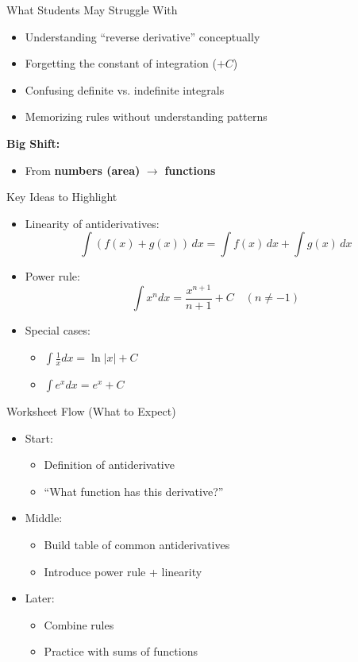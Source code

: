 \documentclass[dvipsnames]{beamer}
\begin{document}
\begin{frame}{What Students May Struggle With}
\begin{itemize}
\item Understanding “reverse derivative” conceptually
\item Forgetting the constant of integration ($+C$)
\item Confusing definite vs. indefinite integrals
\item Memorizing rules without understanding patterns
\end{itemize}

\vspace{0.3cm}

\textbf{Big Shift:}
\begin{itemize}
\item From \textbf{numbers (area)} $\rightarrow$ \textbf{functions}
\end{itemize}
\end{frame}



\begin{frame}{Key Ideas to Highlight}
\begin{itemize}
\item Linearity of antiderivatives:
\[
\int (f(x) + g(x))\,dx = \int f(x)\,dx + \int g(x)\,dx
\]

\item Power rule:
\[
\int x^n dx = \frac{x^{n+1}}{n+1} + C \quad (n \neq -1)
\]

\item Special cases:
\begin{itemize}
\item $\int \frac{1}{x} dx = \ln |x| + C$
\item $\int e^x dx = e^x + C$
\end{itemize}
\end{itemize}
\end{frame}

\begin{frame}{Worksheet Flow (What to Expect)}
\begin{itemize}
\item Start:
\begin{itemize}
\item Definition of antiderivative
\item “What function has this derivative?”
\end{itemize}

\item Middle:
\begin{itemize}
\item Build table of common antiderivatives
\item Introduce power rule + linearity
\end{itemize}

\item Later:
\begin{itemize}
\item Combine rules
\item Practice with sums of functions
\end{itemize}
\end{itemize}
\end{frame}
\end{document}

